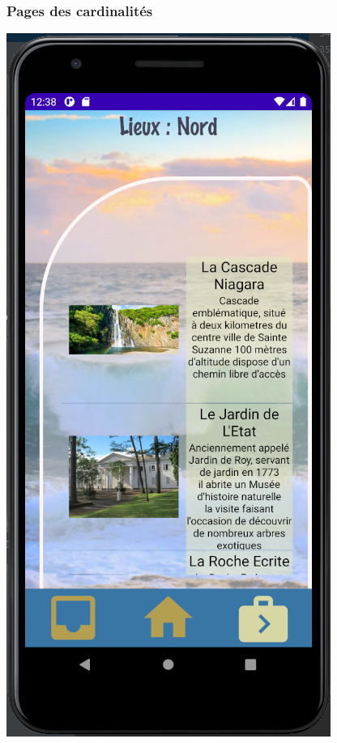 \documentclass{article}
\begin{document}
\subsubsection{\color{purple}Pages des cardinalités}
\begin{minipage}{0.23\textwidth}
\includegraphics[width=\textwidth]{Lieux_nord}
\end{minipage}
\end{document}
